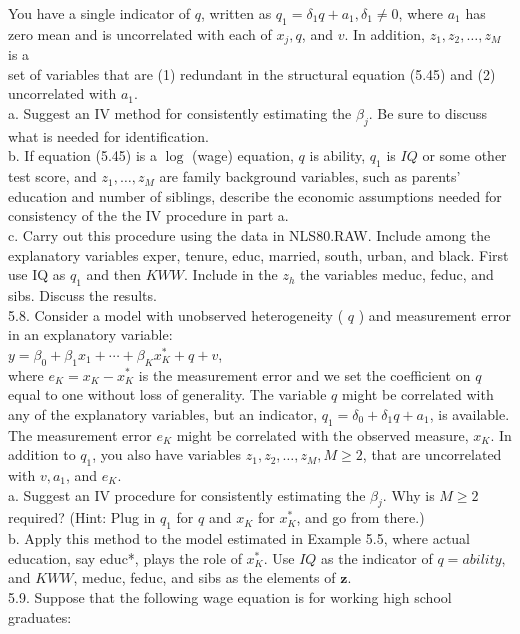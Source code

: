 \documentclass[10pt]{article}
\begin{document}
You have a single indicator of $q$, written as $q_{1}=\delta_{1} q+a_{1}, \delta_{1} \neq 0$, where $a_{1}$ has zero mean and is uncorrelated with each of $x_{j}, q$, and $v$. In addition, $z_{1}, z_{2}, \ldots, z_{M}$ is a\\
set of variables that are (1) redundant in the structural equation (5.45) and (2) uncorrelated with $a_{1}$.\\
a. Suggest an IV method for consistently estimating the $\beta_{j}$. Be sure to discuss what is needed for identification.\\
b. If equation (5.45) is a $\log$ (wage) equation, $q$ is ability, $q_{1}$ is $I Q$ or some other test score, and $z_{1}, \ldots, z_{M}$ are family background variables, such as parents' education and number of siblings, describe the economic assumptions needed for consistency of the the IV procedure in part a.\\
c. Carry out this procedure using the data in NLS80.RAW. Include among the explanatory variables exper, tenure, educ, married, south, urban, and black. First use IQ as $q_{1}$ and then $K W W$. Include in the $z_{h}$ the variables meduc, feduc, and sibs. Discuss the results.\\
5.8. Consider a model with unobserved heterogeneity ( $q$ ) and measurement error in an explanatory variable:\\
$y=\beta_{0}+\beta_{1} x_{1}+\cdots+\beta_{K} x_{K}^{*}+q+v$,\\
where $e_{K}=x_{K}-x_{K}^{*}$ is the measurement error and we set the coefficient on $q$ equal to one without loss of generality. The variable $q$ might be correlated with any of the explanatory variables, but an indicator, $q_{1}=\delta_{0}+\delta_{1} q+a_{1}$, is available. The measurement error $e_{K}$ might be correlated with the observed measure, $x_{K}$. In addition to $q_{1}$, you also have variables $z_{1}, z_{2}, \ldots, z_{M}, M \geq 2$, that are uncorrelated with $v, a_{1}$, and $e_{K}$.\\
a. Suggest an IV procedure for consistently estimating the $\beta_{j}$. Why is $M \geq 2$ required? (Hint: Plug in $q_{1}$ for $q$ and $x_{K}$ for $x_{K}^{*}$, and go from there.)\\
b. Apply this method to the model estimated in Example 5.5, where actual education, say educ*, plays the role of $x_{K}^{*}$. Use $I Q$ as the indicator of $q=a b i l i t y$, and $K W W$, meduc, feduc, and sibs as the elements of $\mathbf{z}$.\\
5.9. Suppose that the following wage equation is for working high school graduates:\\
\end{document}
